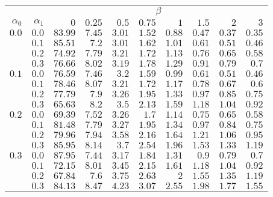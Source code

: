 \begin{tabular}{rr|rrrrrrrr}
\hline\hline
 && \multicolumn{8}{c}{$\beta$}\\
 $\alpha_0$ & $\alpha_1$ & $0$ & $0.25$ & $0.5$ & $0.75$ & $1$ & $1.5$ & $2$ & $3$ \\ 
 \hline
$0.0$ & $0.0$ & $83.99$ & $7.45$ & $3.01$ & $1.52$ & $0.88$ & $0.47$ & $0.37$ & $0.35$\\ 
 & $0.1$ & $85.51$ & $7.2$ & $3.01$ & $1.62$ & $1.01$ & $0.61$ & $0.51$ & $0.46$\\ 
 & $0.2$ & $74.92$ & $7.79$ & $3.21$ & $1.72$ & $1.13$ & $0.76$ & $0.65$ & $0.58$\\ 
 & $0.3$ & $76.66$ & $8.02$ & $3.19$ & $1.78$ & $1.29$ & $0.91$ & $0.79$ & $0.7$\\ 
\hline 
 $0.1$ & $0.0$ & $76.59$ & $7.46$ & $3.2$ & $1.59$ & $0.99$ & $0.61$ & $0.51$ & $0.46$\\ 
 & $0.1$ & $78.46$ & $8.07$ & $3.21$ & $1.72$ & $1.17$ & $0.78$ & $0.67$ & $0.6$\\ 
 & $0.2$ & $77.79$ & $7.9$ & $3.26$ & $1.95$ & $1.33$ & $0.97$ & $0.85$ & $0.75$\\ 
 & $0.3$ & $65.63$ & $8.2$ & $3.5$ & $2.13$ & $1.59$ & $1.18$ & $1.04$ & $0.92$\\ 
\hline 
 $0.2$ & $0.0$ & $69.39$ & $7.52$ & $3.26$ & $1.7$ & $1.14$ & $0.75$ & $0.65$ & $0.58$\\ 
 & $0.1$ & $81.48$ & $7.79$ & $3.27$ & $1.95$ & $1.34$ & $0.97$ & $0.84$ & $0.75$\\ 
 & $0.2$ & $79.96$ & $7.94$ & $3.58$ & $2.16$ & $1.64$ & $1.21$ & $1.06$ & $0.95$\\ 
 & $0.3$ & $85.95$ & $8.14$ & $3.7$ & $2.54$ & $1.96$ & $1.53$ & $1.33$ & $1.19$\\ 
\hline 
 $0.3$ & $0.0$ & $87.95$ & $7.44$ & $3.17$ & $1.84$ & $1.31$ & $0.9$ & $0.79$ & $0.7$\\ 
 & $0.1$ & $72.15$ & $8.01$ & $3.45$ & $2.15$ & $1.61$ & $1.18$ & $1.04$ & $0.92$\\ 
 & $0.2$ & $67.84$ & $7.6$ & $3.75$ & $2.63$ & $2$ & $1.55$ & $1.35$ & $1.19$\\ 
 & $0.3$ & $84.13$ & $8.47$ & $4.23$ & $3.07$ & $2.55$ & $1.98$ & $1.77$ & $1.55$\\ 
 \hline 
 \end{tabular}